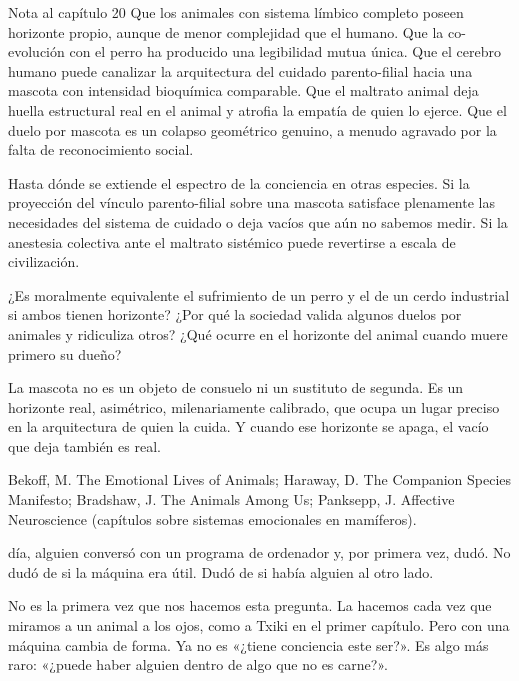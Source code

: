 \begin{notacap}{Nota al capítulo 20}
 Que los animales con sistema límbico completo poseen horizonte propio, aunque de menor complejidad que el humano. Que la co-evolución con el perro ha producido una legibilidad mutua única. Que el cerebro humano puede canalizar la arquitectura del cuidado parento-filial hacia una mascota con intensidad bioquímica comparable. Que el maltrato animal deja huella estructural real en el animal y atrofia la empatía de quien lo ejerce. Que el duelo por mascota es un colapso geométrico genuino, a menudo agravado por la falta de reconocimiento social.

 Hasta dónde se extiende el espectro de la conciencia en otras especies. Si la proyección del vínculo parento-filial sobre una mascota satisface plenamente las necesidades del sistema de cuidado o deja vacíos que aún no sabemos medir. Si la anestesia colectiva ante el maltrato sistémico puede revertirse a escala de civilización.

 ¿Es moralmente equivalente el sufrimiento de un perro y el de un cerdo industrial si ambos tienen horizonte? ¿Por qué la sociedad valida algunos duelos por animales y ridiculiza otros? ¿Qué ocurre en el horizonte del animal cuando muere primero su dueño?

 La mascota no es un objeto de consuelo ni un sustituto de segunda. Es un horizonte real, asimétrico, milenariamente calibrado, que ocupa un lugar preciso en la arquitectura de quien la cuida. Y cuando ese horizonte se apaga, el vacío que deja también es real.

 Bekoff, M. The Emotional Lives of Animals; Haraway, D. The Companion Species Manifesto; Bradshaw, J. The Animals Among Us; Panksepp, J. Affective Neuroscience (capítulos sobre sistemas emocionales en mamíferos).
\end{notacap}
\noindent {} día, alguien conversó con un programa de ordenador y, por primera vez, dudó. No dudó de si la máquina era útil. Dudó de si había alguien al otro lado.

No es la primera vez que nos hacemos esta pregunta. La hacemos cada vez que miramos a un animal a los ojos, como a Txiki en el primer capítulo. Pero con una máquina cambia de forma. Ya no es «¿tiene conciencia este ser?». Es algo más raro: «¿puede haber alguien dentro de algo que no es carne?».

